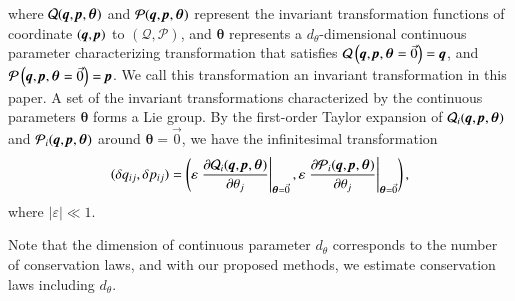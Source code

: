 \documentclass[preprint,
bibnotes,
 amsmath,amssymb,
 aps,
]{revtex4-1}
\newcounter{num}
\begin{document}
where $\mathbf{\mathcal{Q}}(\textit{\textbf{q}},\textit{\textbf{p}}, \boldsymbol{\theta})$ and $\mathbf{\mathcal{P}}(\textit{\textbf{q}},\textit{\textbf{p}}, \boldsymbol{\theta})$ represent the invariant transformation functions of coordinate $(\textit{\textbf{q}},\textit{\textbf{p}})$ to $(\mathbf{\mathcal{Q}},\mathbf{\mathcal{P}})$, and $\boldsymbol{\theta}$ represents a $d_{\theta}$-dimensional continuous parameter characterizing transformation that satisfies  $\mathbf{\mathcal{Q}}\left(\textit{\textbf{q}},\textit{\textbf{p}},\boldsymbol{\theta} = \vec{0}\right) = \textit{\textbf{q}}$, and $\mathbf{\mathcal{P}}\left(\textit{\textbf{q}},\textit{\textbf{p}},\boldsymbol{\theta} = \vec{0}\right) = \textit{\textbf{p}}$. 
We call this transformation an invariant transformation in this paper. 
A set of the invariant transformations characterized by the continuous parameters $\boldsymbol{\theta}$ forms a Lie group. 
By the first-order Taylor expansion of $\mathcal{Q}_i(\textit{\textbf{q}},\textit{\textbf{p}}, \boldsymbol{\theta})$ and $\mathcal{P}_i(\textit{\textbf{q}},\textit{\textbf{p}}, \boldsymbol{\theta})$ around $\boldsymbol{\theta} = \vec{0}$, we have the infinitesimal transformation 
\begin{equation}
(\delta q_{ij},\delta p_{ij}) = \left(\varepsilon \left.\frac{\partial \mathcal{Q}_i(\textit{\textbf{q}},\textit{\textbf{p}}, \boldsymbol{\theta})}{\partial \theta_j}\right|_{\boldsymbol{\theta} = \vec{0}}, \varepsilon \left.\frac{\partial \mathcal{P}_i(\textit{\textbf{q}},\textit{\textbf{p}}, \boldsymbol{\theta})}{\partial \theta_j}\right|_{\boldsymbol{\theta} = \vec{0}}\right),
\end{equation}
where $|\varepsilon| \ll 1$.\par
Note that the dimension of continuous parameter $d_{\theta}$ corresponds to the number of conservation laws, and with our proposed methods, we estimate conservation laws including $d_{\theta}$.
\end{document}
